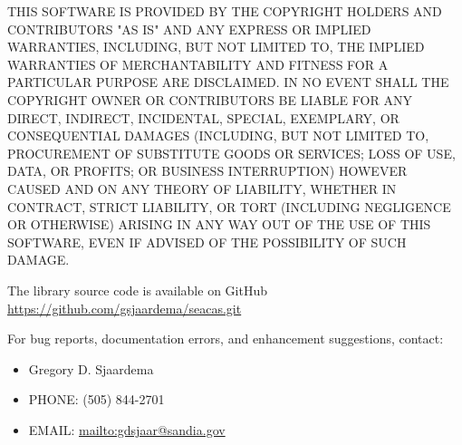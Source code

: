 THIS SOFTWARE IS PROVIDED BY THE COPYRIGHT HOLDERS AND CONTRIBUTORS
"AS IS" AND ANY EXPRESS OR IMPLIED WARRANTIES, INCLUDING, BUT NOT
LIMITED TO, THE IMPLIED WARRANTIES OF MERCHANTABILITY AND FITNESS FOR
A PARTICULAR PURPOSE ARE DISCLAIMED. IN NO EVENT SHALL THE COPYRIGHT
OWNER OR CONTRIBUTORS BE LIABLE FOR ANY DIRECT, INDIRECT, INCIDENTAL,
SPECIAL, EXEMPLARY, OR CONSEQUENTIAL DAMAGES (INCLUDING, BUT NOT
LIMITED TO, PROCUREMENT OF SUBSTITUTE GOODS OR SERVICES; LOSS OF USE,
DATA, OR PROFITS; OR BUSINESS INTERRUPTION) HOWEVER CAUSED AND ON ANY
THEORY OF LIABILITY, WHETHER IN CONTRACT, STRICT LIABILITY, OR TORT
(INCLUDING NEGLIGENCE OR OTHERWISE) ARISING IN ANY WAY OUT OF THE USE
OF THIS SOFTWARE, EVEN IF ADVISED OF THE POSSIBILITY OF SUCH DAMAGE.

The \exo{} library source code is available on GitHub
\url{https://github.com/gsjaardema/seacas.git}

For bug reports, documentation errors, and enhancement suggestions,
contact:
\begin{itemize}
   \item Gregory D. Sjaardema
   \item PHONE: (505) 844-2701
   \item EMAIL: \url{mailto:gdsjaar@sandia.gov}
\end{itemize}
